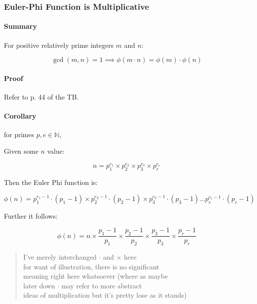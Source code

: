 \documentclass[
]{article}
\begin{document}
\hypertarget{header-n261}{%
\subsubsection{Euler-Phi Function is Multiplicative}\label{header-n261}}

\hypertarget{header-n262}{%
\paragraph{Summary}\label{header-n262}}

For positive relatively prime integers \(m\) and \(n\):

\[\gcd(m, n) = 1 \implies \phi(m \cdot n) = \phi(m) \cdot \phi(n)\]

\hypertarget{header-n265}{%
\paragraph{Proof}\label{header-n265}}

Refer to p. 44 of the TB.

\hypertarget{header-n267}{%
\paragraph{Corollary}\label{header-n267}}

for primes \(p, e \in \mathbb{N}\),

Given some \(n\) value:

\[n = p^{e_1}_1 \times p^{e_2}_2 \times p^{e_3}_3 \times p^{e_r}_r\]

Then the Euler Phi function is:

\[\phi(n) = p^{e_1-1}_1 \cdot (p_1-1) \times p^{e_2-1}_2 \cdot (p_2-1) \times p^{e_3-1}_3 \cdot (p_3-1) \dots p^{e_r-1}_r \cdot (p_r-1)\]

Further it follows:

\[\phi(n) = n \times \frac{p_1 -1}{p_1} \times \frac{p_2 -1}{p_2} \times \frac{p_3 -1}{p_3} \times \frac{p_r -1}{p_r}\]

\begin{quote}
I've merely interchanged \(\cdot\) and \(\times\) here\\
for want of illustration, there is no significant\\
meaning right here whatsoever (where as maybe\\
later down \(\cdot\) may refer to more abstract\\
ideas of multiplication but it's pretty lose as it stands)
\end{quote}
\end{document}
